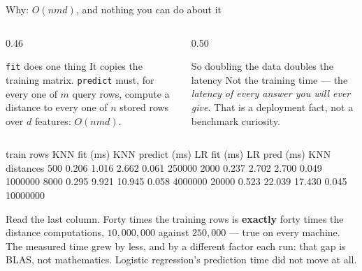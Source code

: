 \documentclass[aspectratio=169]{beamer}
\begin{document}
\begin{frame}[fragile,shrink=6]{Why: $O(nmd)$, and nothing you can do about it}
\begin{columns}[T]
  \begin{column}{0.46\textwidth}
    \begin{block}{\texttt{fit} does one thing}
      \small It copies the training matrix. \texttt{predict} must, for every
      one of $m$ query rows, compute a distance to every one of $n$ stored
      rows over $d$ features: $O(nmd)$.
    \end{block}
  \end{column}
  \begin{column}{0.50\textwidth}
    \begin{alertblock}{So doubling the data doubles the latency}
      \small Not the training time --- the \emph{latency of every answer you
      will ever give}. That is a deployment fact, not a benchmark curiosity.
    \end{alertblock}
  \end{column}
\end{columns}
\vspace{0.2em}
\begin{outblk}
train rows   KNN fit (ms)   KNN predict (ms)   LR fit (ms)   LR pred (ms)   KNN distances
       500          0.206              1.016         2.662         0.061          250000
      2000          0.237              2.702         2.700         0.049         1000000
      8000          0.295              9.921        10.945         0.058         4000000
     20000          0.523             22.039        17.430         0.045       10000000
\end{outblk}
\begin{center}\small
  Read the last column. Forty times the training rows is \textbf{exactly}
  forty times the distance computations, $10{,}000{,}000$ against $250{,}000$
  --- true on every machine. The measured time grew by less, and by a
  different factor each run: that gap is BLAS, not mathematics. Logistic
  regression's prediction time did not move at all.
\end{center}
\end{frame}
\end{document}
